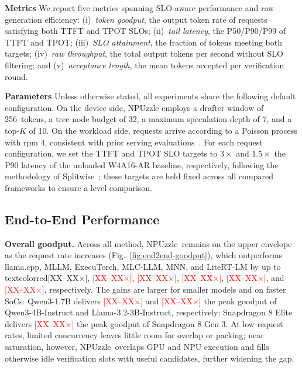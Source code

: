 \documentclass[sigconf,nonacm,10pt]{acmart}
\newcommand{\name}{NPUzzle\xspace}
\begin{document}
{{\noindent\textbf{Metrics}
We report five metrics spanning SLO-aware performance and raw generation 
efficiency:
(i)~\emph{token goodput}, the output token rate of requests satisfying 
both TTFT and TPOT SLOs;
(ii)~\emph{tail latency}, the P50/P90/P99 of TTFT and TPOT;
(iii)~\emph{{\color{red}SLO attainment}}, the fraction of tokens meeting both targets;
(iv)~\emph{raw throughput}, the total output tokens per second without 
SLO filtering; and
(v)~\emph{acceptance length}, the mean tokens accepted per verification 
round.

\noindent\textbf{Parameters}
Unless otherwise stated, all experiments share the following default configuration.  On the device side, \name employs a drafter window of 256~tokens, a tree node budget of 32, a maximum speculation depth of 7, and a top-$K$ of 10. On the workload side, requests arrive according to a Poisson process with rpm {\color{red}$4$}, consistent with prior serving evaluations~\cite{Efficient2023Woosuk,DistServe2024Zhong,agrawal2024sarathi}. For each request configuration, we set the TTFT and TPOT SLO targets to {\color{red}$3\times$ and $1.5\times$} the P90 latency of the unloaded W4A16-AR baseline, respectively, following the methodology of Splitwise~\cite{splitwise2024patel}; these targets are held fixed across all compared frameworks to ensure a level comparison.
% 

\subsection{End-to-End Performance} \label{sec:end2end}
\noindent\textbf{Overall goodput.}
Across all method, \name\ remains on the upper envelope as the request rate increases (Fig.~\ref{fig:end2end-goodput}), which outperforms llama.cpp, MLLM, ExecuTorch, MLC-LLM, MNN, and LiteRT-LM by up to
textcolor{red}{[XX--XX$\times$]},
\textcolor{red}{[XX--XX$\times$]}, \textcolor{red}{[XX--XX$\times$]},
\textcolor{red}{[XX--XX$\times$]}, \textcolor{red}{[XX--XX$\times$]}, and
\textcolor{red}{[XX--XX$\times$]}, respectively. 
The gains are larger for smaller models and on faster SoCs:  Qwen3-1.7B delivers
\textcolor{red}{[XX--XX$\times$]} and \textcolor{red}{[XX--XX$\times$]} the peak
goodput of Qwen3-4B-Instruct and Llama-3.2-3B-Instruct, respectively; Snapdragon 8 Elite delivers \textcolor{red}{[XX--XX$\times$]} the
peak goodput of Snapdragon 8 Gen 3. {\color{red} At low request
rates, limited concurrency leaves little room for overlap or packing;
near saturation, however, \name\ overlaps GPU and NPU execution and
fills otherwise idle verification slots with useful candidates,
further widening the gap. } 

}}
\end{document}
